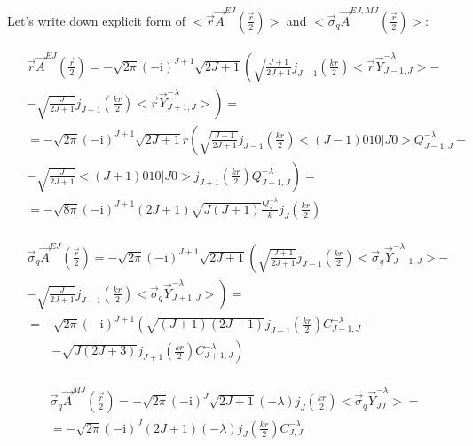 Let's write down explicit form of $<\vec{r}\vec{A}^{EJ}(\frac{\vec{r}}{2})>$ and $<\vec{\sigma}_{q}\vec{A}^{EJ, MJ}(\frac{\vec{r}}{2})>$:

\begin{align}
    \begin{split}
        &\vec{r} \vec{A}^{EJ}(\frac{\vec{r}}{2}) = -\sqrt{2\pi} (- \mathrm{i})^{J+1} \sqrt{2J+1} \left( \sqrt{\frac{J+1}{2J+1}} j_{J-1}(\frac{kr}{2})<\vec{r} \vec{Y}^{-\lambda}_{J-1, J}> - \right.\\
        &- \left. \sqrt{\frac{J}{2J+1}} j_{J+1}(\frac{kr}{2}) <\vec{r} \vec{Y}_{J+1, J}^{-\lambda}> \right) = \\
        &= -\sqrt{2\pi} (- \mathrm{i})^{J+1} \sqrt{2J+1} r \left( \sqrt{\frac{J+1}{2J+1}} j_{J-1}(\frac{kr}{2}) <(J-1) 0 1 0 | J 0> Q_{J-1, J}^{- \lambda} - \right.\\
        &- \left. \sqrt{\frac{J}{2J+1}} <(J+1) 0 1 0 | J 0> j_{J+1}(\frac{kr}{2}) Q_{J+1, J}^{- \lambda} \right) = \\ 
    &= -\sqrt{8\pi} (- \mathrm{i})^{J+1} (2J+1) \sqrt{J (J+1)}  \frac{Q_{J}^{- \lambda}}{k} j_J(\frac{k r}{2})
    \end{split}
\end{align}

\begin{align}
    \begin{split}
        &\vec{\sigma}_q \vec{A}^{EJ}(\frac{\vec{r}}{2}) = -\sqrt{2\pi} (- \mathrm{i})^{J+1} \sqrt{2J+1} \left( \sqrt{\frac{J+1}{2J+1}} j_{J-1}(\frac{kr}{2})<\vec{\sigma}_q \vec{Y}^{- \lambda}_{J-1, J}> - \right.\\
        &\left. -\sqrt{\frac{J}{2J+1}} j_{J+1}(\frac{kr}{2}) <\vec{\sigma}_q \vec{Y}_{J+1, J}^{- \lambda}> \right) = \\
        &= -\sqrt{2\pi} (- \mathrm{i})^{J+1} \left( \sqrt{(J+1)(2J-1)} j_{J-1}(\frac{kr}{2}) C_{J-1, J}^{- \lambda} - \right.\nonumber \\
        &\qquad \left.- \sqrt{J(2J+3)} j_{J+1}(\frac{kr}{2}) C_{J+1, J}^{- \lambda} \right)
    \end{split}
\end{align}

\begin{align}
    \begin{split}
        &\vec{\sigma}_q \vec{A}^{MJ}(\frac{\vec{r}}{2}) = -\sqrt{2\pi }(- \mathrm{i})^J \sqrt{2J + 1} (- \lambda) j_J(\frac{kr}{2}) <\vec{\sigma}_q \vec{Y}^{- \lambda}_{JJ}> = \\
        &= -\sqrt{2\pi }(- \mathrm{i})^J (2J + 1) (- \lambda) j_J(\frac{kr}{2}) C_{J, J}^{- \lambda}
    \end{split}
\end{align}


